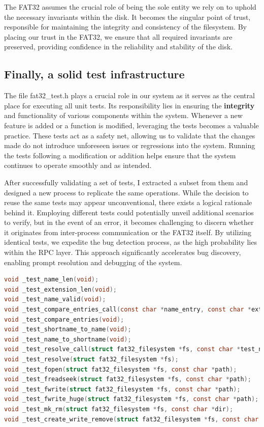 The FAT32 assumes the crucial role of being the sole entity we rely on to uphold the necessary invariants within the disk. It becomes the singular point of trust, responsible for maintaining the integrity and consistency of the filesystem. By placing our trust in the FAT32, we ensure that all required invariants are preserved, providing confidence in the reliability and stability of the disk.

\subsection{Finally, a solid test infrastructure}

The file fat32\_test.h plays a crucial role in our system as it serves as the central place for executing all unit tests. Its responsibility lies in ensuring the \textbf{integrity} and functionality of various components within the system. Whenever a new feature is added or a function is modified, leveraging the tests becomes a valuable practice. These tests act as a safety net, allowing us to validate that the changes made do not introduce unforeseen issues or regressions into the system. Running the tests following a modification or addition helps ensure that the system continues to operate smoothly and as intended.

After successfully validating a set of tests, I extracted a subset from them and designed a new process to replicate the same operations. While the decision to reuse the same tests may appear unconventional, there exists a logical rationale behind it. Employing different tests could potentially unveil additional scenarios to verify, but in the event of an error, it becomes challenging to discern whether it originates from inter-process communication or the FAT32 itself. By utilizing identical tests, we expedite the bug detection process, as the high probability lies within the RPC layer. This approach significantly accelerates bug discovery, enabling prompt resolution and debugging of the system.

\begin{lstlisting}[caption={Unit tests executed},captionpos=b,language=C,frame=single,breaklines]
void _test_name_len(void);
void _test_extension_len(void);
void _test_name_valid(void);
void _test_compare_entries_call(const char *name_entry, const char *extension_entry, const char *name, bool expect);
void _test_compare_entries(void);
void _test_shortname_to_name(void);
void _test_name_to_shortname(void);
void _test_resolve_call(struct fat32_filesystem *fs, const char *test_name, const char *path, bool result);
void _test_resolve(struct fat32_filesystem *fs);
void _test_fopen(struct fat32_filesystem *fs, const char *path);
void _test_freadseek(struct fat32_filesystem *fs, const char *path);
void _test_fwrite(struct fat32_filesystem *fs, const char *path);
void _test_fwrite_huge(struct fat32_filesystem *fs, const char *path);
void _test_mk_rm(struct fat32_filesystem *fs, const char *dir);
void _test_create_write_remove(struct fat32_filesystem *fs, const char *path);

\end{lstlisting}

